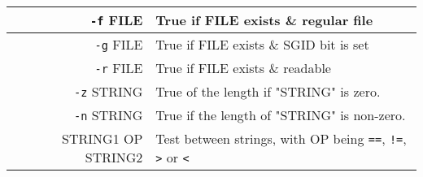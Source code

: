 \documentclass{article}
\newcommand{\inlinecode}[1]{\colorbox{backcolour}{\footnotesize{\texttt{#1}}}}
\begin{document}
\begin{paracol}{2}
{\begin{tabularx}{\linewidth}{| r | >{\raggedright\arraybackslash}X |}
			\inlinecode{-f} FILE        & True if FILE exists \& regular file                                                                    \\\hline
			\inlinecode{-g} FILE        & True if FILE exists \& SGID bit is set                                                                 \\\hline
			\inlinecode{-r} FILE        & True if FILE exists \& readable                                                                        \\\hline
			\inlinecode{-z} STRING      & True of the length if "STRING" is zero.                                                                \\\hline
			\inlinecode{-n} STRING      & True if the length of "STRING" is non-zero.                                                            \\\hline
			STRING1 OP STRING2          & Test between strings, with OP being \inlinecode{==}, \inlinecode{!=}, \inlinecode{>} or \inlinecode{<} \\\hline
		\end{tabularx}}
\end{paracol}
\end{document}
